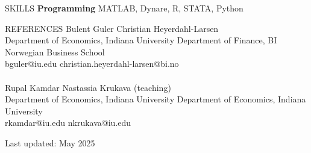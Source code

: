 \documentclass{resume} %
\begin{document}
\begin{rSection}{SKILLS}
\textbf{Programming} MATLAB, Dynare, R, STATA, Python
\end{rSection}

\iffalse
\begin{rSection}{MISCELLANEOUS}
    \begin{itemize}
        \item[]Date of Birth: 1994/10/17 
        \item[]Chinese citizen, F1 Visa holder
    \end{itemize}
\end{rSection}
\fi



\begin{rSection}{REFERENCES}
    Bulent Guler  \hspace{7.5cm} Christian Heyerdahl-Larsen\\
    Department of Economics, Indiana University \hspace{2cm} Department of Finance, BI Norwegian Business School\\
    bguler@iu.edu \hspace{7.35cm} christian.heyerdahl-larsen@bi.no\\
\\
Rupal Kamdar \hspace{7.2cm} Nastassia Krukava (teaching)\\
Department of Economics, Indiana University \hspace{2cm} Department of Economics, Indiana University\\
rkamdar@iu.edu \hspace{7cm} nkrukava@iu.edu 
\end{rSection}





\hfill Last updated: May 2025
\end{document}
